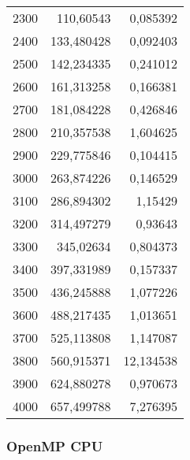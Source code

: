 \begin{tabular}{r r r}
2300 & 110,60543 & 0,085392 \\
2400 & 133,480428 & 0,092403 \\
2500 & 142,234335 & 0,241012 \\
2600 & 161,313258 & 0,166381 \\
2700 & 181,084228 & 0,426846 \\
2800 & 210,357538 & 1,604625 \\
2900 & 229,775846 & 0,104415 \\
3000 & 263,874226 & 0,146529 \\
3100 & 286,894302 & 1,15429 \\
3200 & 314,497279 & 0,93643 \\
3300 & 345,02634 & 0,804373 \\
3400 & 397,331989 & 0,157337 \\
3500 & 436,245888 & 1,077226 \\
3600 & 488,217435 & 1,013651 \\
3700 & 525,113808 & 1,147087 \\
3800 & 560,915371 & 12,134538 \\
3900 & 624,880278 & 0,970673 \\
4000 & 657,499788 & 7,276395 \\
\end{tabular}

\subsubsection{OpenMP CPU}

